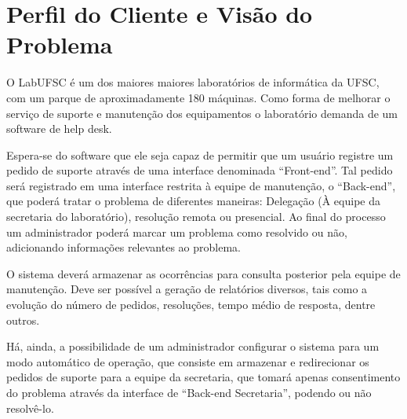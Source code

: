 \documentclass[brazil,times]{abnt}
\begin{document}






\capa

\folhaderosto

\tableofcontents

\chapter{Perfil do Cliente e Visão do Problema}
O LabUFSC é um dos maiores maiores laboratórios de informática da UFSC, com um
parque de aproximadamente 180 máquinas. Como forma de melhorar o serviço de 
suporte e manutenção dos equipamentos o laboratório demanda de um software de
help desk.

Espera-se do software que ele seja capaz de permitir que um usuário registre um
pedido de suporte através de uma interface denominada “Front-end”. Tal pedido
será registrado em uma interface restrita à equipe de manutenção, o “Back-end”,
que poderá tratar o problema de diferentes maneiras: Delegação (À equipe da
secretaria do laboratório), resolução remota ou presencial. Ao final do
processo um administrador poderá marcar um problema como resolvido ou não,
adicionando informações relevantes ao problema.

O sistema deverá armazenar as ocorrências para consulta posterior pela equipe
de manutenção. Deve ser possível a geração de relatórios diversos, tais como a
evolução do número de pedidos, resoluções, tempo médio de resposta, dentre
outros.

Há, ainda, a possibilidade de um administrador configurar o sistema para um
modo automático de operação, que consiste em armazenar e redirecionar os
pedidos de suporte para a equipe da secretaria, que tomará apenas consentimento
do problema através da interface de “Back-end Secretaria”, podendo ou não resolvê-lo.
\end{document}
